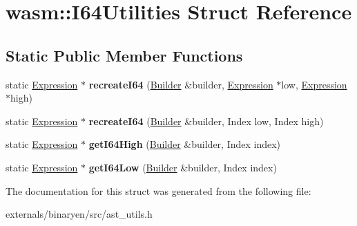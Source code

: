 \hypertarget{structwasm_1_1_i64_utilities}{}\section{wasm\+:\+:I64\+Utilities Struct Reference}
\label{structwasm_1_1_i64_utilities}
\subsection*{Static Public Member Functions}
\begin{DoxyCompactItemize}
\item 
\mbox{\label{structwasm_1_1_i64_utilities_a5f27fe1e2387e8add810210f6c96acc0}} 
static \mbox{\hyperlink{classwasm_1_1_expression}{Expression}} $\ast$ {\bfseries recreate\+I64} (\mbox{\hyperlink{classwasm_1_1_builder}{Builder}} \&builder, \mbox{\hyperlink{classwasm_1_1_expression}{Expression}} $\ast$low, \mbox{\hyperlink{classwasm_1_1_expression}{Expression}} $\ast$high)
\item 
\mbox{\label{structwasm_1_1_i64_utilities_a8a8d6649ee1f481272c6d8f1583da095}} 
static \mbox{\hyperlink{classwasm_1_1_expression}{Expression}} $\ast$ {\bfseries recreate\+I64} (\mbox{\hyperlink{classwasm_1_1_builder}{Builder}} \&builder, Index low, Index high)
\item 
\mbox{\label{structwasm_1_1_i64_utilities_a9898a60d0c7865e2cce872718d01989b}} 
static \mbox{\hyperlink{classwasm_1_1_expression}{Expression}} $\ast$ {\bfseries get\+I64\+High} (\mbox{\hyperlink{classwasm_1_1_builder}{Builder}} \&builder, Index index)
\item 
\mbox{\label{structwasm_1_1_i64_utilities_ade11c169705f492f85d5840287ea16f2}} 
static \mbox{\hyperlink{classwasm_1_1_expression}{Expression}} $\ast$ {\bfseries get\+I64\+Low} (\mbox{\hyperlink{classwasm_1_1_builder}{Builder}} \&builder, Index index)
\end{DoxyCompactItemize}


The documentation for this struct was generated from the following file\+:\begin{DoxyCompactItemize}
\item 
externals/binaryen/src/ast\+\_\+utils.\+h\end{DoxyCompactItemize}

